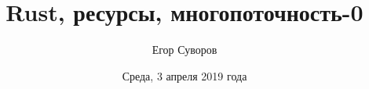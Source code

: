 \documentclass[utf8,xcolor=table]{beamer}
\title[Rust]{Rust, ресурсы, многопоточность-0}
\author{Егор Суворов}
\institute[СПбГУ]{Курс <<Парадигмы и языки программирования>>, группа 18.Б09-пу}
\date[03.04.2019]{Среда, 3 апреля 2019 года}
\begin{document}
\begin{frame}
\titlepage
\end{frame}




\end{document}

